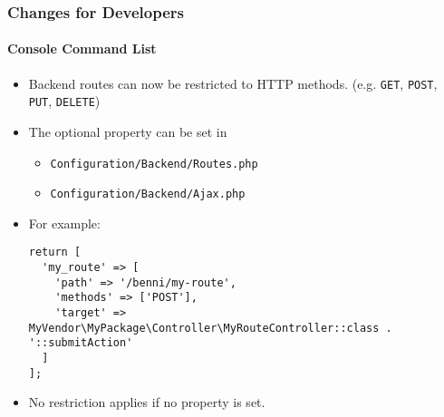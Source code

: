 %

\begin{frame}[fragile]
	\frametitle{Changes for Developers}
	\framesubtitle{Console Command List}


	\begin{itemize}
		\item Backend routes can now be restricted to HTTP methods.\newline
			\small(e.g. \texttt{GET}, \texttt{POST}, \texttt{PUT}, \texttt{DELETE})
		\item The optional property  can be set in
			\begin{itemize}\smaller
				\item \texttt{Configuration/Backend/Routes.php}
				\item \texttt{Configuration/Backend/Ajax.php}
			\end{itemize}
			\vspace{0.2cm}
		\item For example:
\begin{lstlisting}
return [
  'my_route' => [
    'path' => '/benni/my-route',
    'methods' => ['POST'],
    'target' => MyVendor\MyPackage\Controller\MyRouteController::class . '::submitAction'
  ]
];
\end{lstlisting}

		\item No restriction applies if no property is set.

	\end{itemize}

\end{frame}

